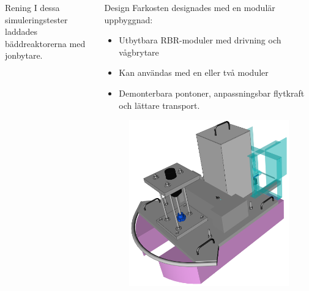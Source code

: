 \documentclass[final]{beamer}
\newlength{\onecolwid}
\begin{document}
\begin{frame}[t]
\begin{columns}[t, totalwidth=0.99\textwidth]
\begin{column}{\onecolwid}
\begin{block}{Rening}
        I dessa simuleringstester
        laddades bäddreaktorerna med jonbytare.

      \end{block}

    \end{column}

    \begin{column}{\onecolwid}

      \begin{block}{Design}
        Farkosten designades med en modulär uppbyggnad:
          \begin{itemize}
          \item Utbytbara RBR-moduler med drivning och vågbrytare
          \item Kan användas med en eller två moduler
          \item Demonterbara pontoner, anpassningsbar flytkraft och lättare transport.
          \end{itemize}

        \vskip 5cm
        \begin{figure}[H]
          \centering
          \hbox{\hspace{-4.5cm}\includegraphics[width=27cm]{figures/front_box_off.png}}
        \end{figure}


\end{block}
\end{column}
\end{columns}
\end{frame}
\end{document}
